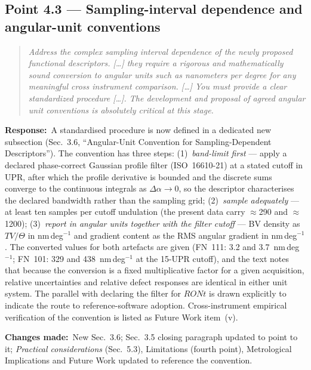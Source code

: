 \documentclass[11pt,a4paper]{article}
\newenvironment{reviewercomment}%
{\par\medskip\noindent\begin{quotation}\itshape\color{black!70}}%
{\end{quotation}\medskip}
\newcommand{\response}{\par\noindent\textbf{Response:}\ }
\newcommand{\changes}{\par\noindent\textbf{Changes made:}\ }
\begin{document}
\subsection*{Point 4.3 --- Sampling-interval dependence and angular-unit conventions}
\begin{reviewercomment}
Address the complex sampling interval dependence of the newly proposed functional descriptors. [\ldots] they require a rigorous and mathematically sound conversion to angular units such as nanometers per degree for any meaningful cross instrument comparison. [\ldots] You must provide a clear standardized procedure [\ldots]. The development and proposal of agreed angular unit conventions is absolutely critical at this stage.
\end{reviewercomment}
\response A standardised procedure is now defined in a dedicated new subsection (Sec.~3.6, ``Angular-Unit Convention for Sampling-Dependent Descriptors''). The convention has three steps: (1)~\emph{band-limit first} --- apply a declared phase-correct Gaussian profile filter (ISO~16610-21) at a stated cutoff in UPR, after which the profile derivative is bounded and the discrete sums converge to the continuous integrals as $\Delta\alpha \to 0$, so the descriptor characterises the declared bandwidth rather than the sampling grid; (2)~\emph{sample adequately} --- at least ten samples per cutoff undulation (the present data carry $\approx$290 and $\approx$1200); (3)~\emph{report in angular units together with the filter cutoff} --- BV density as $TV/\Theta$ in nm\,deg$^{-1}$ and gradient content as the RMS angular gradient in nm\,deg$^{-1}$. The converted values for both artefacts are given (FN~111: 3.2 and 3.7~nm\,deg$^{-1}$; FN~101: 329 and 438~nm\,deg$^{-1}$ at the 15-UPR cutoff), and the text notes that because the conversion is a fixed multiplicative factor for a given acquisition, relative uncertainties and relative defect responses are identical in either unit system. The parallel with declaring the filter for $RONt$ is drawn explicitly to indicate the route to reference-software adoption. Cross-instrument empirical verification of the convention is listed as Future Work item~(v).
\changes New Sec.~3.6; Sec.~3.5 closing paragraph updated to point to it; \emph{Practical considerations} (Sec.~5.3), Limitations (fourth point), Metrological Implications and Future Work updated to reference the convention.
\end{document}
